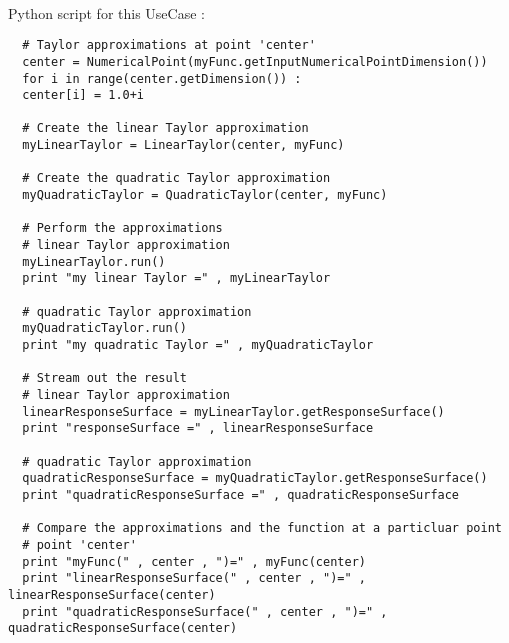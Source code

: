 \textspace\\
Python  script for this UseCase :

\begin{lstlisting}
  # Taylor approximations at point 'center'
  center = NumericalPoint(myFunc.getInputNumericalPointDimension())
  for i in range(center.getDimension()) :
  center[i] = 1.0+i

  # Create the linear Taylor approximation
  myLinearTaylor = LinearTaylor(center, myFunc)

  # Create the quadratic Taylor approximation
  myQuadraticTaylor = QuadraticTaylor(center, myFunc)

  # Perform the approximations
  # linear Taylor approximation
  myLinearTaylor.run()
  print "my linear Taylor =" , myLinearTaylor

  # quadratic Taylor approximation
  myQuadraticTaylor.run()
  print "my quadratic Taylor =" , myQuadraticTaylor

  # Stream out the result
  # linear Taylor approximation
  linearResponseSurface = myLinearTaylor.getResponseSurface()
  print "responseSurface =" , linearResponseSurface

  # quadratic Taylor approximation
  quadraticResponseSurface = myQuadraticTaylor.getResponseSurface()
  print "quadraticResponseSurface =" , quadraticResponseSurface

  # Compare the approximations and the function at a particluar point
  # point 'center'
  print "myFunc(" , center , ")=" , myFunc(center)
  print "linearResponseSurface(" , center , ")=" , linearResponseSurface(center)
  print "quadraticResponseSurface(" , center , ")=" , quadraticResponseSurface(center)
\end{lstlisting}
